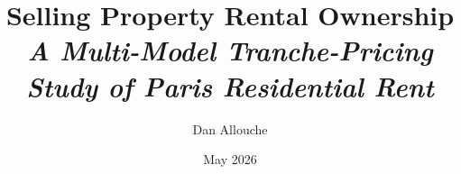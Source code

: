 
\usepackage[a4paper, margin=2.4cm, footskip=1cm]{geometry}
\usepackage[utf8]{inputenc}
\usepackage[T1]{fontenc}
\usepackage{lmodern}
\usepackage{microtype}
\usepackage{setspace}
\onehalfspacing

\usepackage{amsmath, amssymb, mathtools, amsthm}
\usepackage{bm}
\usepackage{booktabs}
\usepackage{multirow}
\usepackage{array}
\usepackage{siunitx}
\usepackage{graphicx}
\graphicspath{{figures/}{../artifacts/figures/}}
\usepackage{caption}
\captionsetup{font=small, labelfont=bf, labelsep=period}
\usepackage{subcaption}
\usepackage{xcolor}
\usepackage[hidelinks]{hyperref}
\usepackage[capitalise, noabbrev]{cleveref}
\usepackage[round, sort&compress]{natbib}

\newcommand{\autocite}[1]{\citep{#1}}
\usepackage{eurosym}
\providecommand{\EUR}{\euro}
\usepackage{tikz}
\usetikzlibrary{positioning, arrows.meta, calc}

\newtheorem{definition}{Definition}[section]
\newtheorem{assumption}[definition]{Assumption}
\newtheorem{proposition}[definition]{Proposition}

\newcommand{\R}{\mathbb{R}}
\newcommand{\N}{\mathbb{N}}
\newcommand{\E}{\mathbb{E}}
\newcommand{\Prob}{\mathbb{P}}
\newcommand{\Var}{\operatorname{Var}}
\newcommand{\Cov}{\operatorname{Cov}}
\newcommand{\dW}{\mathrm{d}W}
\newcommand{\dt}{\mathrm{d}t}
\newcommand{\given}{\mid}
\DeclareMathOperator{\VaR}{VaR}
\DeclareMathOperator{\ES}{ES}
\DeclareMathOperator*{\argmin}{arg\,min}

\title{\bfseries\Large Selling Property Rental Ownership\\
  \large\itshape A Multi-Model Tranche-Pricing Study of Paris Residential Rent}
\author{Dan Allouche}
\date{May 2026}
